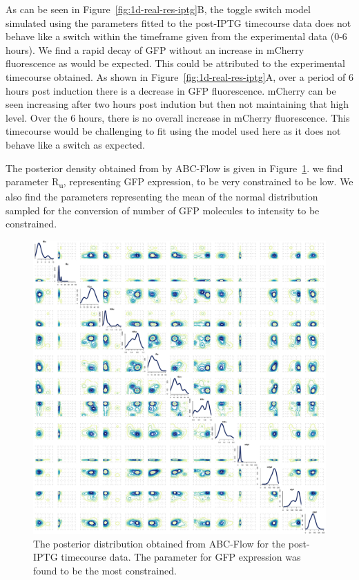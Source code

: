 As can be seen in Figure~\ref{fig:1d-real-res-iptg}B, the toggle switch model simulated using the parameters fitted to the post-IPTG timecourse data does not behave like a switch within the timeframe given from the experimental data (0-6 hours). We find a rapid decay of GFP without an increase in mCherry fluorescence as would be expected. This could be attributed to the experimental timecourse obtained. As shown in Figure~\ref{fig:1d-real-res-iptg}A, over a period of 6 hours post induction there is a decrease in GFP fluorescence. mCherry can be seen increasing after two hours post indution but then not maintaining that high level. Over the 6 hours, there is no overall increase in mCherry fluorescence. This timecourse would be challenging to fit using the model used here as it does not behave like a switch as expected. 


The posterior density obtained from by ABC-Flow is given in Figure~\ref{fig:1atc-post}. we find parameter R\textsubscript{u}, representing GFP expression, to be very constrained to be low. We also find the parameters representing the mean of the normal distribution sampled for the conversion of number of GFP molecules to intensity to be constrained. 

\begin{figure}[htbp]
\centerfloat
	\includegraphics[width=\textwidth]{../../chapters/chapterABCFlow/images/real_data_stuff/posterior2D_pop8_100p.pdf}
	\caption[LoF caption]{\label{fig:1atc-post} The posterior distribution obtained from ABC-Flow for the post-IPTG timecourse data. The parameter for GFP expression was found to be the most constrained. }
\end{figure}


